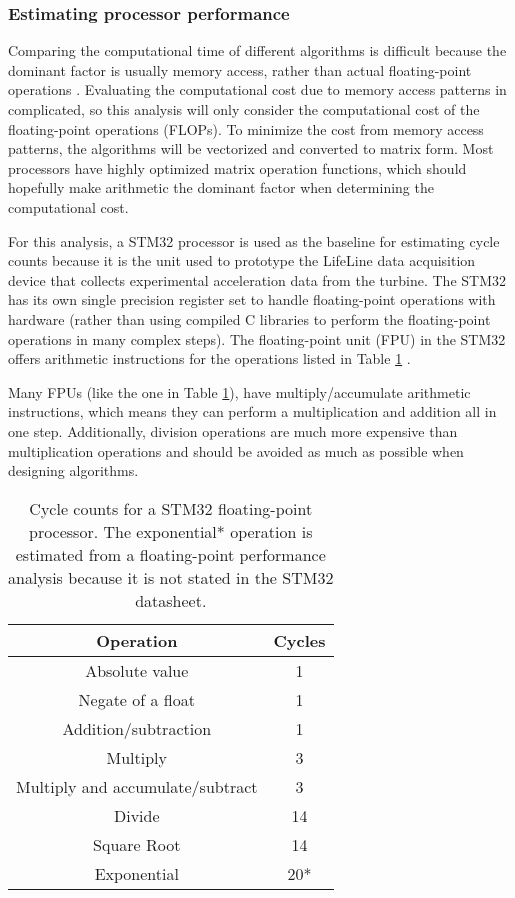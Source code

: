 \subsubsection{Estimating processor performance}
Comparing the computational time of different algorithms is difficult because the dominant factor is usually memory access, rather than actual floating-point operations \cite{wiki_fft}.  Evaluating the computational cost due to memory access patterns in complicated, so this analysis will only consider the computational cost of the floating-point operations (FLOPs).  To minimize the cost from memory access patterns, the algorithms will be vectorized and converted to matrix form.  Most processors have highly optimized matrix operation functions, which should hopefully make arithmetic the dominant factor when determining the computational cost.

For this analysis, a STM32 processor is used as the baseline for estimating cycle counts because it is the unit used to prototype the LifeLine data acquisition device that collects experimental acceleration data from the turbine.  The STM32 has its own single precision register set to handle floating-point operations with hardware (rather than using compiled C libraries to perform the floating-point operations in many complex steps).  The floating-point unit (FPU) in the STM32 offers arithmetic instructions for the operations listed in Table \ref{t:stm32_cycles} \cite{stm32_floating_point}.

Many FPUs (like the one in Table \ref{t:stm32_cycles}), have multiply/accumulate arithmetic instructions, which means they can perform a multiplication and addition all in one step.  Additionally, division operations are much more expensive than multiplication operations and should be avoided as much as possible when designing algorithms.

\begin{table}[]
\centering
\caption{Cycle counts for a STM32 floating-point processor.  The exponential* operation is estimated from a floating-point performance analysis \cite{flops_performance} because it is not stated in the STM32 datasheet.}
\label{t:stm32_cycles}
\vspace*{0.2in}
\begin{tabular}{|c|c|}
\rowcolor[HTML]{EFEFEF} 
\hline
\textbf{Operation} & \textbf{Cycles} \\ \hline
Absolute value & 1 \\ \hline
Negate of a float & 1 \\ \hline
Addition/subtraction & 1 \\ \hline
Multiply & 3 \\ \hline
Multiply and accumulate/subtract & 3 \\ \hline
Divide & 14 \\ \hline
Square Root & 14 \\ \hline
Exponential & 20* \\ \hline
\end{tabular}
\end{table}



